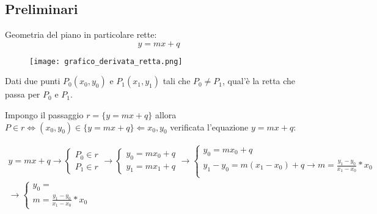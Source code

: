 \documentclass[../main.tex, class=article, 12pt]{subfiles}
\begin{document}
\subsection{Preliminari}\label{sec:preliminari}

Geometria del piano in particolare rette:
\begin{equation*}
        y = mx + q
\end{equation*}
\begin{figure}[h]
  	\texttt{[image: grafico\_derivata\_retta.png]}
  	\caption{}
        \label{fig:grafico_derivata_retta.png}
\end{figure}
Dati due punti $ P_0(x_0, y_0) $ e $ P_1(x_1, y_1)$ tali che $ P_0 \not = P_1 $, qual'è la retta che passa per $ P_0 $ e $ P_1 $. \par
Impongo il passaggio $ r = \{y = mx + q\} $ allora $ P\in r \Leftrightarrow (x_0, y_0) \in \{y = mx + q\} \Leftarrow x_0,y_0$ verificata l'equazione $ y = mx + q $:

\begin{align*}
 y = mx + q \rightarrow
\begin{cases}
        P_0 \in r \\
        P_1 \in r
\end{cases}
\rightarrow
\begin{cases}
        y_0 = mx_0 + q\\
        y_1 = mx_1 + q
\end{cases}
 \rightarrow 
\begin{cases}
        y_0 = mx_0 + q\\
        y_1 - y_0 = m(x_1 - x_0) + q \rightarrow m = \frac{y_1-y_0}{x_1-x_0} * x_0\\
\end{cases}
\\
\rightarrow 
\begin{cases}
        y_0 = \\
        m = \frac{y_1-y_0}{x_1-x_0} * x_0
\end{cases}
\end{align*}
\end{document}
